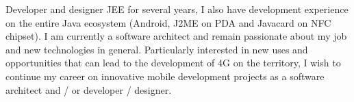 %
%
% 
%
\par{
Developer and designer JEE for several years, I also have development experience on the entire Java ecosystem (Android, J2ME on PDA and Javacard on NFC chipset). I am currently a software architect and remain passionate about my job and new technologies in general. Particularly interested in new uses and opportunities that can lead to the development of 4G on the territory, I wish to continue my career on innovative mobile development projects as a software architect and / or developer / designer.
}